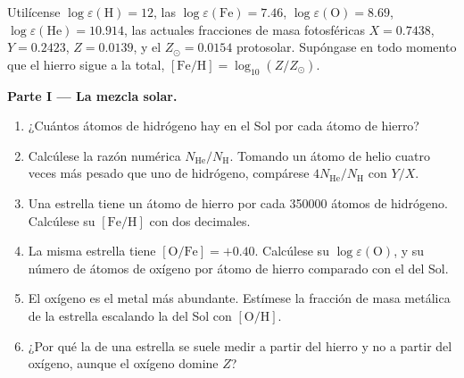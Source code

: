 \begin{problem}
\label{pb:b3:origin-of-elements:1}
Utilícense $\log\varepsilon(\mathrm{H}) = 12$, las 
$\log\varepsilon(\mathrm{Fe}) = 7.46$, $\log\varepsilon(\mathrm{O}) =
8.69$, $\log\varepsilon(\mathrm{He}) = 10.914$, las actuales
fracciones de masa fotosféricas $X = 0.7438$, $Y = 0.2423$, $Z = 0.0139$,
y el $Z_\odot = 0.0154$ protosolar. Supóngase en todo momento que el hierro
sigue a la  total, $[\mathrm{Fe/H}] = \log_{10}(Z/Z_\odot)$.

\medskip\noindent\textbf{Parte I --- La mezcla solar.}
\begin{enumerate}
\item ¿Cuántos átomos de hidrógeno hay en el Sol por cada átomo de hierro?
\item Calcúlese la razón numérica $N_\mathrm{He}/N_\mathrm{H}$. Tomando un
  átomo de helio cuatro veces más pesado que uno de hidrógeno, compárese
  $4N_\mathrm{He}/N_\mathrm{H}$ con $Y/X$.
\item Una estrella tiene un átomo de hierro por cada \num{350000} átomos de hidrógeno.
  Calcúlese su $[\mathrm{Fe/H}]$ con dos decimales.
\item La misma estrella tiene $[\mathrm{O/Fe}] = +0.40$. Calcúlese su
  $\log\varepsilon(\mathrm{O})$, y su número de átomos de oxígeno por átomo
  de hierro comparado con el del Sol.
\item El oxígeno es el metal más abundante. Estímese la fracción de masa
  metálica de la estrella escalando la del Sol con $[\mathrm{O/H}]$.
\item ¿Por qué la  de una estrella se suele medir a partir del hierro
  y no a partir del oxígeno, aunque el oxígeno domine $Z$?
\end{enumerate}


\end{problem}
